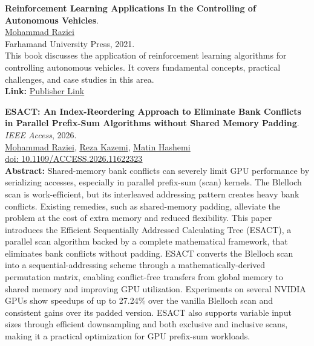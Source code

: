 \documentclass[a4paper,11pt]{article}
\begin{document}
\item \faBook\hspace{3pt} \textbf{Reinforcement Learning Applications In the Controlling of Autonomous Vehicles}.\\
\href{https://mohammadraziei.github.io}{\uline{Mohammad Raziei}}\\
Farhamand University Press, 2021.\\
This book discusses the application of reinforcement learning algorithms for controlling autonomous vehicles. It covers fundamental concepts, practical challenges, and case studies in this area.\\
\textbf{Link:} \href{https://farbook.ir/BookView/61151/%d9%83%d8%a7%d8%b1%d8%a8%d8%b1%d8%af-%d9%8a%d8%a7%d8%af%da%af%d9%8a%d8%b1%d9%8a-%d8%aa%d9%82%d9%88%d9%8a%d8%aa%d9%8a-%d8%af%d8%b1-%d9%83%d9%86%d8%aa%d8%b1%d9%84-%d8%a7%d8%aa%d9%88%d9%85%d8%a8%d9%8a%d9%84-%d9%87%d8%a7%d9%8a-%d8%ae%d9%88%d8%af%d8%b1%d8%a7%d9%86}{\uline{Publisher Link}}

\item \faFile\hspace{3pt} \textbf{ESACT: An Index-Reordering Approach to Eliminate Bank Conflicts in Parallel Prefix-Sum Algorithms without Shared Memory Padding}. \textit{IEEE Access}, 2026.\\
\href{https://mohammadraziei.github.io}{\uline{Mohammad Raziei}}, 
\href{https://sina.sharif.edu/~reza.kazemi/}{\uline{Reza Kazemi}}, 
\href{https://sina.sharif.edu/~matin/}{\uline{Matin Hashemi}}\\
\href{https://ieeexplore.ieee.org/document/11622323}{\uline{doi: 10.1109/ACCESS.2026.11622323}}\\
\textbf{Abstract:} Shared-memory bank conflicts can severely limit GPU performance by serializing accesses, especially in parallel prefix-sum (scan) kernels. The Blelloch scan is work-efficient, but its interleaved addressing pattern creates heavy bank conflicts. Existing remedies, such as shared-memory padding, alleviate the problem at the cost of extra memory and reduced flexibility. This paper introduces the Efficient Sequentially Addressed Calculating Tree (ESACT), a parallel scan algorithm backed by a complete mathematical framework, that eliminates bank conflicts without padding. ESACT converts the Blelloch scan into a sequential-addressing scheme through a mathematically-derived permutation matrix, enabling conflict-free transfers from global memory to shared memory and improving GPU utilization. Experiments on several NVIDIA GPUs show speedups of up to 27.24\% over the vanilla Blelloch scan and consistent gains over its padded version. ESACT also supports variable input sizes through efficient downsampling and both exclusive and inclusive scans, making it a practical optimization for GPU prefix-sum workloads.
\end{document}
